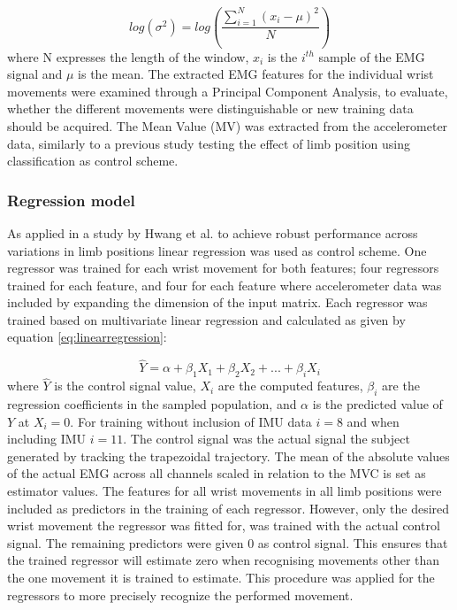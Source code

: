\begin{multicols}{2}
\begin{equation} \label{eq:logvar}
log(\sigma^2) = log(\frac{\sum\limits_{i=1}^N(x_i - \mu)^2}{N})
\end{equation}
where N expresses the length of the window, $x_i$ is the $i^{th}$ sample of the EMG signal and $\mu$ is the mean.
The extracted EMG features for the individual wrist movements were examined through a Principal Component Analysis, to evaluate, whether the different movements were distinguishable or new training data should be acquired.
The Mean Value (MV) was extracted from the accelerometer data, similarly to a previous study \cite{Krasoulis2015} testing the effect of limb position using classification as control scheme. 

\subsubsection*{Regression model}
As applied in a study by Hwang et al. \cite{Hwang2017} to achieve robust performance across variations in limb positions linear regression was used as control scheme. One regressor was trained for each wrist movement for both features; four regressors trained for each feature, and four for each feature where accelerometer data was included by expanding the dimension of the input matrix. Each regressor was trained based on multivariate linear regression and calculated as given by equation \ref{eq:linearregression}:

\begin{equation} \label{eq:linearregression}
\hat{Y} = \alpha + \beta_1 X_{1} + \beta_2 X_{2} + ... + \beta_i X_{i}
\end{equation}
where $\hat{Y}$ is the control signal value, $X_i$ are the computed features, $\beta_i$ are the regression coefficients in the sampled population, and $\alpha$ is the predicted value of $Y$ at $X_{i} = 0$. For training without inclusion of IMU data $i = 8$ and when including IMU $i = 11$. The control signal was the actual signal the subject generated by tracking the trapezoidal trajectory. The mean of the absolute values of the actual EMG across all channels scaled in relation to the MVC is set as estimator values. The features for all wrist movements in all limb positions were included as predictors in the training of each regressor. However, only the desired wrist movement the regressor was fitted for, was trained with the actual control signal. The remaining predictors were given 0 as control signal. This ensures that the trained regressor will estimate zero when recognising movements other than the one movement it is trained to estimate. This procedure was applied for the regressors to more precisely recognize the performed movement.


\end{multicols}
